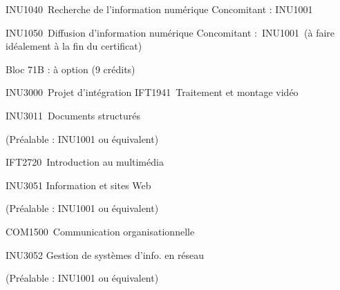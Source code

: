\documentclass [12 pt]{article}
\begin{document}
                        
                            INU1040 Recherche de l'information numérique
                            Concomitant : INU1001
                        
                        
                            INU1050 Diffusion d'information numérique
                            Concomitant : INU1001 (à faire
                                idéalement à la fin du certificat)
                        
                        
                            
                                Bloc 71B : à option (9 crédits)
                            
                        
                        
                            INU3000 Projet d'intégration
                            IFT1941 Traitement et montage vidéo
                        
                        
                            
                                INU3011 Documents
                                    structurés
                                
                                    (Préalable : INU1001 ou équivalent)
                                
                            
                            
                                IFT2720 Introduction au
                                    multimédia
                            
                        
                        
                            
                                INU3051 Information et sites Web
                                
                                    (Préalable : INU1001 ou équivalent)
                                
                            
                            COM1500 Communication organisationnelle
                        
                        
                            
                                INU3052 Gestion de systèmes d'info. en réseau
                                
                                    (Préalable : INU1001 ou équivalent)
                                
\end{document}
